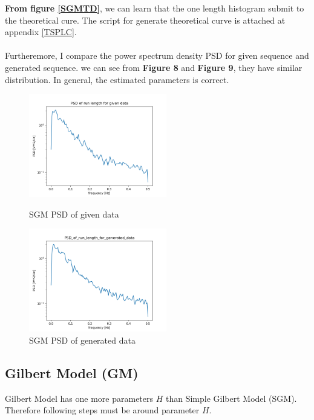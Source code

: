 \documentclass[11pt]{article}
\begin{document}
\textbf{From figure \ref{SGMTD}}, we can learn that the one length histogram submit to the theoretical cure.
The script for generate theoretical curve is attached at appendix \ref{TSPLC}.
\paragraph{}
Furtheremore, I compare the power spectrum density PSD for given sequence and generated sequence.
we can see from \textbf{Figure 8} and \textbf{Figure 9}, they have similar distribution.
In general, the estimated parameters is correct.
\begin{figure}[htbp]
    \centering
    \begin{minipage}[t]{0.48\textwidth}
    \centering
    \includegraphics[width=6cm]{PSD_of_run_length_for_given_data.png}
    \caption{SGM PSD of given data}
    \end{minipage}
    \begin{minipage}[t]{0.48\textwidth}
    \centering
    \includegraphics[width=6cm]{PSD_of_run_length_for_generated_data.png}
    \caption{SGM PSD of generated data}
    \end{minipage}
\end{figure}
\clearpage
\subsection{Gilbert Model (GM)}
Gilbert Model has one more parameters $H$ than Simple Gilbert Model (SGM). Therefore following steps must be around parameter $H$.
\end{document}
